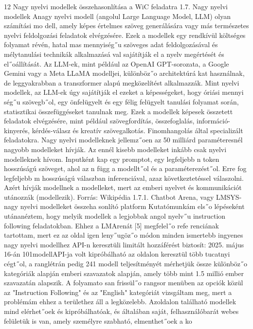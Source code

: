 \documentclass[12pt]{report}
\theoremstyle{definition}
\begin{document}
 12
Nagy nyelvi modellek összehasonlítása a WiC feladatra
 1.7. Nagy nyelvi modellek
 Anagy nyelvi modell (angolul Large Language Model, LLM) olyan számítási mo
dell, amely képes értelmes szöveg generálására vagy más természetes nyelvi feldolgozási
 feladatok elvégzésére. Ezek a modellek egy rendkívül költséges folyamat révén, hatal
mas mennyiség˝u szöveges adat feldolgozásával és mélytanulási technikák alkalmazásá
val sajátítják el a nyelv megértését és el˝oállítását. Az LLM-ek, mint például az OpenAI
 GPT-sorozata, a Google Gemini vagy a Meta LLaMA modelljei, különböz˝o architektúrá
kat használnak, de leggyakrabban a transzformer alapú megközelítést alkalmazzák. Mint
 nyelvi modellek, az LLM-ek úgy sajátítják el ezeket a képességeket, hogy óriási mennyi
ség˝u szövegb˝ol, egy önfelügyelt és egy félig felügyelt tanulási folyamat során, statisztikai
 összefüggéseket tanulnak meg. Ezek a modellek képesek összetett feladatok elvégzésére,
 mint például szövegfordítás, összefoglalás, információ-kinyerés, kérdés-válasz és kreatív
 szövegalkotás. Finomhangolás által specializált feladatokra. Nagy nyelvi modelleknek
 jellemz˝oen az 50 milliárd paraméteresnél nagyobb modelleket hívják. Az ennél kisebb
 modelleket inkább csak nyelvi modelleknek hívom.
 Inputként kap egy promptot, egy legfeljebb n token hosszúságú szöveget, ahol az
 n függ a modellt˝ol és a paraméterezést˝ol. Erre fog legfeljebb m hosszúságú válaszban
 inferenciával, azaz következtetéssel válaszolni. Azért hívják modellnek a modelleket,
 mert az emberi nyelvet és kommunikációt utánozzák (modellezik).
 Forrás: Wikipédia
 1.7.1. Chatbot Arena, vagy LMSYS- nagy nyelvi modelleket összeha
sonlító platform
 Kutatómunkám els˝o lépéseként utánanéztem, hogy melyik modellek a legjobbak
 angol nyelv˝u instruction following feladatokban. Ehhez a LMArenát [5] megfelel˝o refe
renciának tartottam, mert ez az oldal igen leny˝ugöz˝o módon minden ismertebb ingyenes
 nagy nyelvi modellhez API-n keresztüli limitált hozzáférést biztosít: 2025. május 16-án
 101modellAPI-ja volt kipróbálható az oldalon keresztül több tucatnyi cégt˝ol, a ranglétrán
 pedig 241 modell teljesítményét mérhetjük össze különböz˝o kategóriák alapján emberi
 szavazatok alapján, amely több mint 1.5 millió ember szavazatán alapszik. A folyamato
san frissül˝o rangsor menüben az opciók közül az "Instruction Following" és az "English"
 kategóriát vizsgáltam meg, mert a problémám ehhez a területhez áll a legközelebb.
 Azoldalon található modellek mind elérhet˝oek és kipróbálhatóak, és általában saját,
 felhasználóbarát webes felületük is van, amely személyre szabható, elmenthet˝oek a ko
\end{document}
